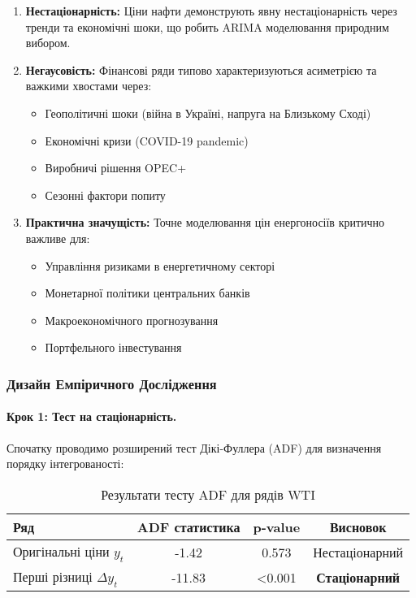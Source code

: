 \documentclass[12pt,a4paper]{article}
\begin{document}
\begin{enumerate}
    \item \textbf{Нестаціонарність:} Ціни нафти демонструють явну нестаціонарність через тренди та економічні шоки, що робить ARIMA моделювання природним вибором.

    \item \textbf{Негаусовість:} Фінансові ряди типово характеризуються асиметрією та важкими хвостами через:
    \begin{itemize}
        \item Геополітичні шоки (війна в Україні, напруга на Близькому Сході)
        \item Економічні кризи (COVID-19 pandemic)
        \item Виробничі рішення OPEC+
        \item Сезонні фактори попиту
    \end{itemize}

    \item \textbf{Практична значущість:} Точне моделювання цін енергоносіїв критично важливе для:
    \begin{itemize}
        \item Управління ризиками в енергетичному секторі
        \item Монетарної політики центральних банків
        \item Макроекономічного прогнозування
        \item Портфельного інвестування
    \end{itemize}
\end{enumerate}

\subsubsection{Дизайн Емпіричного Дослідження}
\label{subsubsec:wti_research_design}

\paragraph{Крок 1: Тест на стаціонарність.}
Спочатку проводимо розширений тест Дікі-Фуллера (ADF) для визначення порядку інтегрованості:

\begin{table}[h]
\centering
\caption{Результати тесту ADF для рядів WTI}
\label{tab:wti_adf_test}
\begin{tabular}{lccc}
\toprule
\textbf{Ряд} & \textbf{ADF статистика} & \textbf{p-value} & \textbf{Висновок} \\
\midrule
Оригінальні ціни $y_t$ & -1.42 & 0.573 & Нестаціонарний \\
Перші різниці $\Delta y_t$ & -11.83 & <0.001 & \textbf{Стаціонарний} \\
\bottomrule
\end{tabular}
\end{table}
\end{document}
